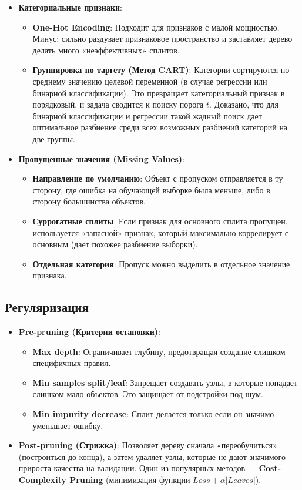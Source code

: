 \documentclass[12pt]{article}
\begin{document}
\begin{itemize}
    \item \textbf{Категориальные признаки}:
    \begin{itemize}
        \item \textbf{One-Hot Encoding}: Подходит для признаков с малой мощностью. Минус: сильно раздувает признаковое пространство и заставляет дерево делать много «неэффективных» сплитов.
        \item \textbf{Группировка по таргету (Метод CART)}: Категории сортируются по среднему значению целевой переменной (в случае регрессии или бинарной классификации). Это превращает категориальный признак в порядковый, и задача сводится к поиску порога $t$. Доказано, что для бинарной классификации и регрессии такой жадный поиск дает оптимальное разбиение среди всех возможных разбиений категорий на две группы.
    \end{itemize}
    
    \item \textbf{Пропущенные значения (Missing Values)}:
    \begin{itemize}
        \item \textbf{Направление по умолчанию}: Объект с пропуском отправляется в ту сторону, где ошибка на обучающей выборке была меньше, либо в сторону большинства объектов.
        \item \textbf{Суррогатные сплиты}: Если признак для основного сплита пропущен, используется «запасной» признак, который максимально коррелирует с основным (дает похожее разбиение выборки).
        \item \textbf{Отдельная категория}: Пропуск можно выделить в отдельное значение признака.
    \end{itemize}
\end{itemize}

\subsection{Регуляризация}

\begin{itemize}
    \item \textbf{Pre-pruning (Критерии остановки)}:
    \begin{itemize}
        \item \textbf{Max depth}: Ограничивает глубину, предотвращая создание слишком специфичных правил.
        \item \textbf{Min samples split/leaf}: Запрещает создавать узлы, в которые попадает слишком мало объектов. Это защищает от подстройки под шум.
        \item \textbf{Min impurity decrease}: Сплит делается только если он значимо уменьшает ошибку.
    \end{itemize}
    \item \textbf{Post-pruning (Стрижка)}:
    Позволяет дереву сначала «переобучиться» (построиться до конца), а затем удаляет узлы, которые не дают значимого прироста качества на валидации. Один из популярных методов — \textbf{Cost-Complexity Pruning} (минимизация функции $Loss + \alpha |Leaves|$).
\end{itemize}
\end{document}

